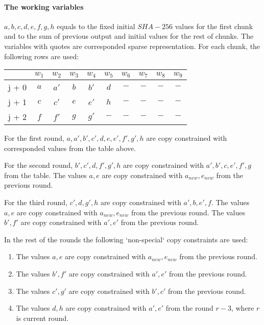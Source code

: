\paragraph{The working variables}
$ a,  b , c , d, e, f, g, h$ equals to the fixed initial $SHA-256$ values for the first chunk and to the sum of previous output and initial values for the rest of chunks. 
The variables with quotes are corresponded sparse representation.
For each chunk, the following rows are used:
\begin{center}
    \begin{tabular}{ c|c|c|c|c|c|c|c|c|c }
        & $w_1$  & $w_2$  & $w_3$  & $w_4$  & $w_5$  & $w_6$ & $w_7$ & $w_8$ & $w_9$  \\
        \hline
        j + 0 & $a$ & $a'$ & $b$ & $b' $  & $d$  & $-$   & $-$ & $-$  & $-$   \\
        j + 1 & $c$  & $c'$ & $e$ & $e'$ & $h$ & $-$ & $-$ & $-$ & $-$ \\
        j + 2 & $f$ & $f'$ & $g$ & $g'$ & $-$ & $-$ & $-$ & $-$ & $-$\\
    \end{tabular}
\end{center}
For the first round, $a, a', b', c' , d, e, e', f', g', h$ are copy constrained with corresponded values from the table above.

For the second round, $b', c' , d, f', g', h$ are copy constrained with $a', b', c, e', f', g$ from the table.
The values $a, e$ are copy constrained with $a_{new}, e_{new}$ from the previous round.

For the third round, $c' , d, g', h$ are copy constrained with $a', b, e', f$.
The values $a, e$ are copy constrained with $a_{new}, e_{new}$ from the previous round.
The values $b', f'$ are copy constrained with $a', e'$ from the previous round.

In the rest of the rounds the following `non-special` copy constraints are used:
\begin{enumerate}
\item The values $a, e$ are copy constrained with $a_{new}, e_{new}$ from the previous round.
\item The values $b', f'$ are copy constrained with $a', e'$ from the previous round.
\item The values $c', g'$ are copy constrained with $b', c'$ from the previous round.
\item The values $d, h$ are copy constrained with $a', e'$ from the round $r - 3$, where $r$ is current round.
\end{enumerate}

